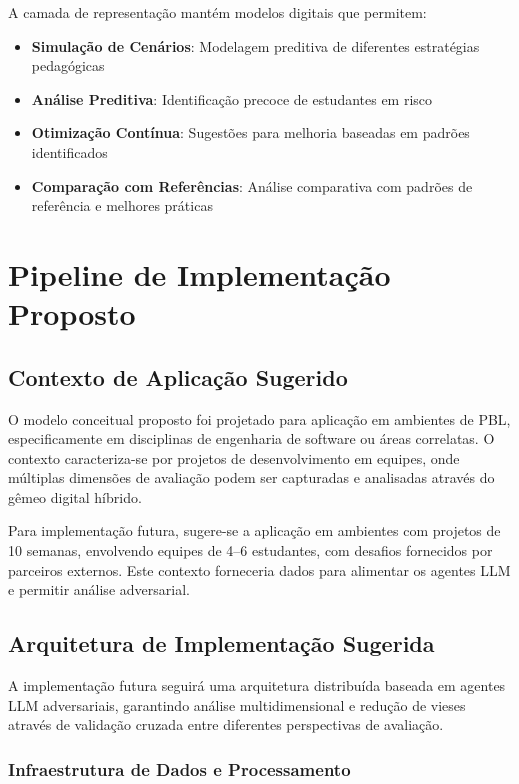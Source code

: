 \documentclass[english, spanish, brazilian]{modelo_dt}
\begin{document}
A camada de representação mantém modelos digitais que permitem:
\begin{itemize}
\item \textbf{Simulação de Cenários}: Modelagem preditiva de diferentes estratégias pedagógicas
\item \textbf{Análise Preditiva}: Identificação precoce de estudantes em risco
\item \textbf{Otimização Contínua}: Sugestões para melhoria baseadas em padrões identificados
\item \textbf{Comparação com Referências}: Análise comparativa com padrões de referência e melhores práticas
\end{itemize}

\section{Pipeline de Implementação Proposto}

\subsection{Contexto de Aplicação Sugerido}

O modelo conceitual proposto foi projetado para aplicação em ambientes de PBL, especificamente em disciplinas de engenharia de software ou áreas correlatas. O contexto caracteriza-se por projetos de desenvolvimento em equipes, onde múltiplas dimensões de avaliação podem ser capturadas e analisadas através do gêmeo digital híbrido.

Para implementação futura, sugere-se a aplicação em ambientes com projetos de 10 semanas, envolvendo equipes de 4--6 estudantes, com desafios fornecidos por parceiros externos. Este contexto forneceria dados para alimentar os agentes LLM e permitir análise adversarial.

\subsection{Arquitetura de Implementação Sugerida}

A implementação futura seguirá uma arquitetura distribuída baseada em agentes LLM adversariais, garantindo análise multidimensional e redução de vieses através de validação cruzada entre diferentes perspectivas de avaliação.

\subsubsection{Infraestrutura de Dados e Processamento}
\end{document}
